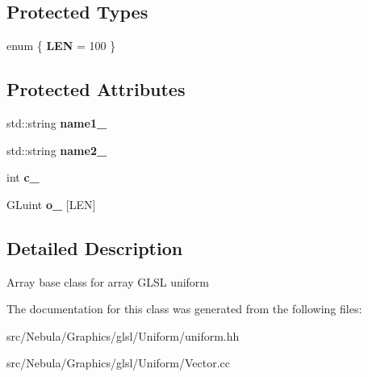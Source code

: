 \subsection*{\-Protected \-Types}
\begin{DoxyCompactItemize}
\item 
enum \{ {\bfseries \-L\-E\-N} =  100
 \}
\end{DoxyCompactItemize}
\subsection*{\-Protected \-Attributes}
\begin{DoxyCompactItemize}
\item 
\hypertarget{classNeb_1_1glsl_1_1Uniform_1_1Vector_1_1Base_a78a4f2843f5c87f11d67b5a29c95d6c2}{std\-::string {\bfseries name1\-\_\-}}\label{classNeb_1_1glsl_1_1Uniform_1_1Vector_1_1Base_a78a4f2843f5c87f11d67b5a29c95d6c2}

\item 
\hypertarget{classNeb_1_1glsl_1_1Uniform_1_1Vector_1_1Base_a2080091cb0f43f60e48f7c667cc3d65b}{std\-::string {\bfseries name2\-\_\-}}\label{classNeb_1_1glsl_1_1Uniform_1_1Vector_1_1Base_a2080091cb0f43f60e48f7c667cc3d65b}

\item 
\hypertarget{classNeb_1_1glsl_1_1Uniform_1_1Vector_1_1Base_adada72e697489b74dcca62bd2a6404d1}{int {\bfseries c\-\_\-}}\label{classNeb_1_1glsl_1_1Uniform_1_1Vector_1_1Base_adada72e697489b74dcca62bd2a6404d1}

\item 
\hypertarget{classNeb_1_1glsl_1_1Uniform_1_1Vector_1_1Base_a3e462add25f07b5e7b2815179f928b76}{\-G\-Luint {\bfseries o\-\_\-} \mbox{[}\-L\-E\-N\mbox{]}}\label{classNeb_1_1glsl_1_1Uniform_1_1Vector_1_1Base_a3e462add25f07b5e7b2815179f928b76}

\end{DoxyCompactItemize}


\subsection{\-Detailed \-Description}
\-Array base class for array \-G\-L\-S\-L uniform 

\-The documentation for this class was generated from the following files\-:\begin{DoxyCompactItemize}
\item 
src/\-Nebula/\-Graphics/glsl/\-Uniform/uniform.\-hh\item 
src/\-Nebula/\-Graphics/glsl/\-Uniform/\-Vector.\-cc\end{DoxyCompactItemize}
